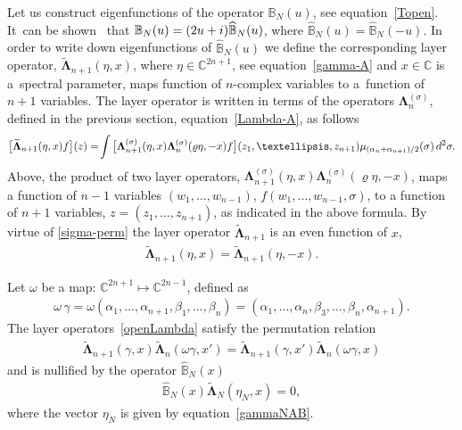 \documentclass[11pt]{article}
\numberwithin{equation}{section}
\numberwithin{equation}{section}
\begin{document}
Let us construct eigenfunctions of the operator $\mathbb B_N(u)$, see equation~\eqref{Topen}. It~can be shown~\cite{Derkachov:2003qb} that $
\mathbb B_N(u)=(2u+{\rm i}) \widehat{\mathbb B}_N(u)$, where $\widehat{\mathbb B}_N(u)=\widehat{\mathbb B}_N(-u)$. In order to write down
eigenfunctions of $\widehat{\mathbb B}_N(u)$ we define the corresponding layer operator, $\widetilde{ \boldsymbol \Lambda}_{n+1}(\eta,x)$,
where $\eta\in \mathbb C^{2n+1}$, see equation~\eqref{gamma-A} and $x\in\mathbb C$ is a~spectral parameter, maps function of $n$-complex variables to a~function of $n+1$ variables.
The layer operator is written in terms of the operators $\boldsymbol \Lambda_n^{(\sigma)}$, defined in the previous section, equation~\eqref{Lambda-A}, as follows
\begin{gather}\label{openLambda}
\big[\widetilde{ \boldsymbol \Lambda}_{n+1}(\eta,x) f\big](z)
=\!
\int \big[\boldsymbol \Lambda^{(\sigma)}_{n+1}(\eta,x)\boldsymbol \Lambda^{(\sigma)}_{n}(\varrho\eta,-x) f\big](z_1,\dots, z_{n+1})
\mu_{{(\alpha_{n}+\alpha_{n+1})}/2}(\sigma)\, {\rm d}^2\sigma .
\end{gather}
Above, the product of two layer operators, $\boldsymbol \Lambda^{(\sigma)}_{n+1}(\eta,x)\boldsymbol \Lambda^{(\sigma)}_{n}(\varrho\eta,-x)
$, maps a function of $n-1$ variables $(w_1,\dots, w_{n-1})$, $f(w_1,\dots, w_{n-1},\sigma)$, to a function of $n+1$ variables, $ z=(z_1,\dots,z_{n+1})$, as indicated in
the above formula. By virtue of \eqref{sigma-perm}
 the layer operator $\widetilde{\boldsymbol \Lambda}_{n+1}$ is an even function of $x$,
\begin{gather*}
\widetilde{ \boldsymbol \Lambda}_{n+1}(\eta,x)= \widetilde{ \boldsymbol \Lambda}_{n+1}(\eta,-x).
\end{gather*}

Let $\omega$ be a map: $\mathbb C^{2n+1}\mapsto \mathbb C^{2n-1}$, defined as
\begin{gather*}
\omega\,\gamma=\omega(\alpha_1,\dots,\alpha_{n+1},\beta_{1},\dots,\beta_n)
=(\alpha_1,\dots,\alpha_n,\beta_{3},\dots,\beta_{n},\alpha_{n+1}).
\end{gather*}
The layer operators~\eqref{openLambda} satisfy the permutation relation~\cite{Derkachov:2003qb}
\begin{gather*}
\widetilde{ \boldsymbol \Lambda}_{n+1}(\gamma,x)\widetilde{ \boldsymbol \Lambda}_{n}(\omega\gamma,x')=
\widetilde{ \boldsymbol \Lambda}_{n+1}(\gamma,x')\widetilde{ \boldsymbol \Lambda}_{n}(\omega\gamma,x)
\end{gather*}
and is nullified by the operator $\widehat{\mathbb B}_N(x)$
\begin{gather}\label{BopenL=0}
\widehat{\mathbb B}_N(x)\widetilde{ \boldsymbol \Lambda}_{N}(\eta_N,x)=0,
\end{gather}
where the vector $\eta_N$ is given by equation~\eqref{gammaNAB}.
\end{document}
